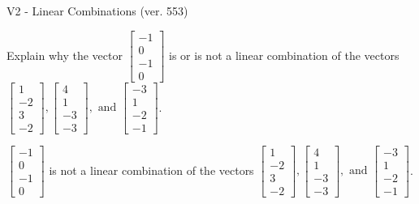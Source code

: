 \begin{exercise}
  \begin{exerciseTitle}V2 - Linear Combinations (ver. 553)\end{exerciseTitle}
  \begin{exerciseStatement}
    Explain why the vector \(\left[\begin{array}{c}
-1 \\
0 \\
-1 \\
0
\end{array}\right]\)  is or is not a linear 
	combination of the vectors \(\left[\begin{array}{c}
1 \\
-2 \\
3 \\
-2
\end{array}\right] , \left[\begin{array}{c}
4 \\
1 \\
-3 \\
-3
\end{array}\right] , \text{ and } \left[\begin{array}{c}
-3 \\
1 \\
-2 \\
-1
\end{array}\right]\).
	


  \end{exerciseStatement}
  \begin{exerciseAnswer}
   \(\left[\begin{array}{c}
-1 \\
0 \\
-1 \\
0
\end{array}\right]\) 
  	 is not  
	a linear combination of the vectors \(\left[\begin{array}{c}
1 \\
-2 \\
3 \\
-2
\end{array}\right] , \left[\begin{array}{c}
4 \\
1 \\
-3 \\
-3
\end{array}\right] , \text{ and } \left[\begin{array}{c}
-3 \\
1 \\
-2 \\
-1
\end{array}\right]\).

	
  


  \end{exerciseAnswer}
\end{exercise}